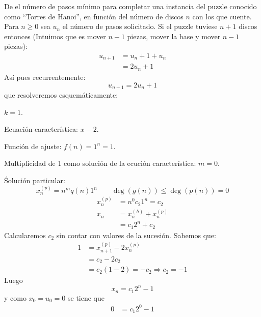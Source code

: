 \begin{ejercicio}
    De el número de pasos mínimo para completar una instancia del puzzle conocido como ``Torres de Hanoi'', en función del número de discos $n$ con los que cuente.\\

    Para $n \geq 0$ sea $u_n$ el número de pasos solicitado. Si el puzzle tuviese $n+1$ discos entonces (Intuimos que es mover $n-1$ piezas, mover la base y mover $n-1$ piezas):
    \begin{align*}
        u_{n+1} &= u_n + 1 + u_n \\
                &= 2u_n +1
    \end{align*}
    Así pues recurrentemente:
    \begin{equation*}
        u_{n+1} = 2u_n + 1
    \end{equation*}
    que resolveremos esquemáticamente:
    \begin{description}
        \item $k = 1$.
        \item Ecuación característica: $x-2$.
        \item Función de ajuste: $f(n) = 1^n = 1$.
        \item Multiplicidad de 1 como solución de la ecución característica: $m = 0$.
    \end{description}
    Śolución particular:
    \begin{equation*}
        x_n^{(p)} = n^m q(n)1^n \qquad \deg(g(n)) \leq \deg(p(n)) = 0
    \end{equation*}
    \begin{align*}
        x_n^{(p)} &= n^0 c_2 1^n = c_2 \\
        x_n &= x_n^{(h)} + x_n^{(p)} \\
            &= c_1 2^n + c_2 
    \end{align*}
    Calcularemos $c_2$ sin contar con valores de la sucesión. Sabemos que:
    \begin{align*}
        1 &= x_{n+1}^{(p)} - 2x_n^{(p)} \\
          &= c_2 - 2 c_2 \\
          &= c_2 (1-2) = -c_2 \Longrightarrow c_2 = -1
    \end{align*}
    Luego 
    \begin{equation*}
        x_n = c_1 2^n - 1
    \end{equation*}
    y como $x_0 = u_0 = 0$ se tiene que
    \begin{align*}
        0 &= c_1 2^0 - 1 \\

\end{align*}
\end{ejercicio}
